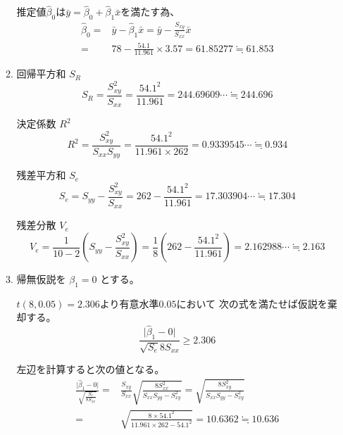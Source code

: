\documentclass[12pt,b5paper]{ltjsarticle}
\begin{document}
\begin{enumerate}
\begin{enumerate}
            推定値$\hat{\beta}_0$は$\bar{y}=\hat{\beta}_0+\hat{\beta}_1\bar{x}$を満たす為、
            \begin{align}
             \hat{\beta}_0
             =& \bar{y}-\hat{\beta}_1\bar{x}
             = \bar{y}- \frac{S_{xy}}{S_{xx}}\bar{x}\\
             =& 78-\frac{54.1}{11.961}\times 3.57
             = 61.85277 \fallingdotseq 61.853
            \end{align}


       \item
            回帰平方和 $S_R$
            \begin{equation}
             S_R = \frac{S_{xy}^2}{S_{xx}}
             = \frac{54.1^2}{11.961}
             = 244.69609\cdots \fallingdotseq 244.696
            \end{equation}

            決定係数 $R^2$
            \begin{equation}
             R^2 = \frac{S_{xy}^2}{S_{xx}S_{yy}}
             = \frac{54.1^2}{11.961\times 262}
             = 0.9339545\cdots \fallingdotseq 0.934
            \end{equation}

            残差平方和 $S_e$
            \begin{equation}
             S_e = S_{yy}-\frac{S_{xy}^2}{S_{xx}}
             = 262 - \frac{54.1^2}{11.961}
             =  17.303904\cdots \fallingdotseq 17.304
            \end{equation}

            残差分散 $V_e$
            \begin{equation}
             V_e = \frac{1}{10-2}\left(S_{yy}-\frac{S_{xy}^2}{S_{xx}}\right)
             = \frac{1}{8}\left( 262 - \frac{54.1^2}{11.961} \right)
             = 2.162988\cdots \fallingdotseq 2.163
            \end{equation}

       \item

            帰無仮説を $\beta_1 =0$ とする。

            $t(8,0.05)=2.306$より有意水準$0.05$において
            次の式を満たせば仮説を棄却する。
            \begin{equation}
             \frac{\lvert \hat{\beta}_1-0 \rvert}{\sqrt{S_e}{8S_{xx}}} \geq 2.306
            \end{equation}

            左辺を計算すると次の値となる。
            \begin{align}
             \frac{\lvert \hat{\beta}_1-0 \rvert}{\sqrt{\frac{S_e}{8S_{xx}}}}
              =& \frac{S_{xy}}{S_{xx}} \sqrt{ \frac{8S_{xx}^2}{S_{xx}S_{yy}-S_{xy}^2} }
              = \sqrt{ \frac{8S_{xy}^2}{S_{xx}S_{yy}-S_{xy}^2} }\\
             =& \sqrt{ \frac{8\times 54.1^2}{11.961\times262-54.1^2} }
             = 10.6362 \fallingdotseq 10.636
            \end{align}


\end{enumerate}
\end{enumerate}
\end{document}
